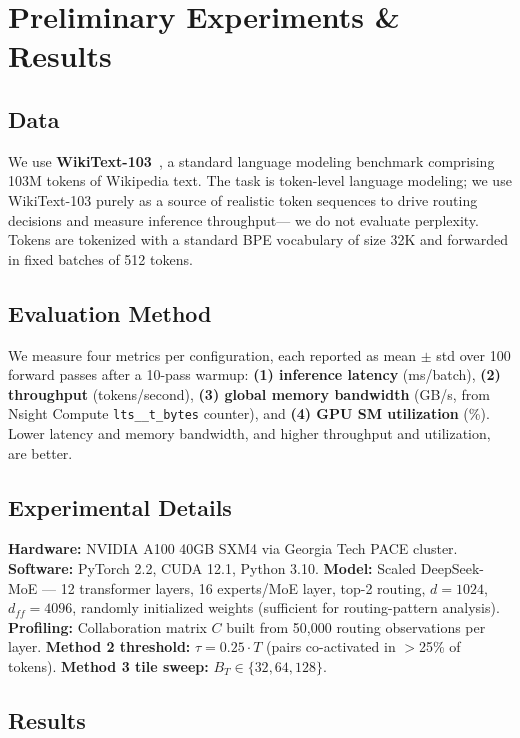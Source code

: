 \documentclass{article}
\begin{document}
\section{Preliminary Experiments \& Results}
 
\subsection{Data}
 
We use \textbf{WikiText-103}~\citep{merity2017pointer}, a standard language modeling
benchmark comprising 103M tokens of Wikipedia text.
The task is token-level language modeling; we use WikiText-103 purely as a source of
realistic token sequences to drive routing decisions and measure inference throughput—
we do not evaluate perplexity.
Tokens are tokenized with a standard BPE vocabulary of size 32K and forwarded in
fixed batches of 512 tokens.
 
\subsection{Evaluation Method}
 
We measure four metrics per configuration, each reported as mean $\pm$ std over 100
forward passes after a 10-pass warmup:
\textbf{(1) inference latency} (ms/batch),
\textbf{(2) throughput} (tokens/second),
\textbf{(3) global memory bandwidth} (GB/s, from Nsight Compute
\texttt{lts\_\_t\_bytes} counter), and
\textbf{(4) GPU SM utilization} (\%).
Lower latency and memory bandwidth, and higher throughput and utilization, are better.
 
\subsection{Experimental Details}
 
\textbf{Hardware:} NVIDIA A100 40GB SXM4 via Georgia Tech PACE cluster.
\textbf{Software:} PyTorch 2.2, CUDA 12.1, Python 3.10.
\textbf{Model:} Scaled DeepSeek-MoE — 12 transformer layers, 16 experts/MoE layer,
top-2 routing, $d\!=\!1024$, $d_{ff}\!=\!4096$, randomly initialized weights
(sufficient for routing-pattern analysis).
\textbf{Profiling:} Collaboration matrix $C$ built from 50{,}000 routing observations
per layer.
\textbf{Method 2 threshold:} $\tau = 0.25 \cdot T$ (pairs co-activated in $>$25\% of tokens).
\textbf{Method 3 tile sweep:} $B_T \in \{32, 64, 128\}$.
 
\subsection{Results}
 
\end{document}
